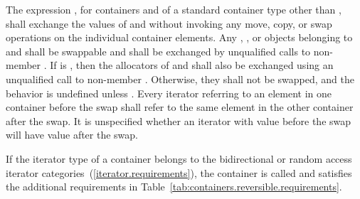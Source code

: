\pnum
The expression , for containers  and  of a standard
container type other than , shall exchange the values of  and
 without invoking any move, copy, or swap operations on the individual
container elements. Any , , or  objects
belonging to  and  shall be swappable
and shall be exchanged by unqualified calls to non-member . If
 is
, then the allocators of  and  shall also be exchanged
using an unqualified call to non-member . Otherwise, they shall not be
swapped, and the behavior is
undefined unless . Every iterator
referring to an element in one container before the swap shall refer to the same
element in the other container after the swap. It is unspecified whether an iterator
with value  before the swap will have value  after the
swap.

\pnum
If the iterator type of a container belongs to the bidirectional or
random access iterator categories~(\ref{iterator.requirements}),
the container is called
and satisfies the additional requirements
in Table~\ref{tab:containers.reversible.requirements}.


